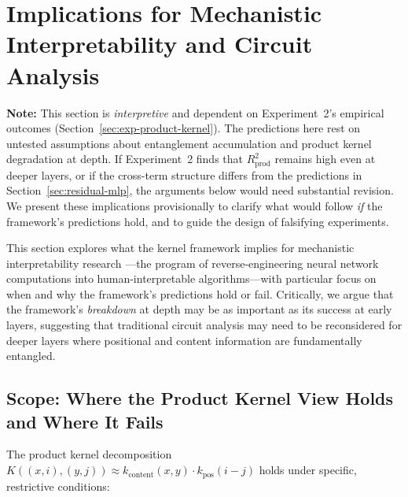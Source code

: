 \documentclass[11pt]{article}
\theoremstyle{definition}
\begin{document}
\section{Implications for Mechanistic Interpretability and Circuit Analysis}
\label{sec:circuits-implications}

\textbf{Note:} This section is \emph{interpretive} and dependent on Experiment~2's empirical outcomes (Section~\ref{sec:exp-product-kernel}). The predictions here rest on untested assumptions about entanglement accumulation and product kernel degradation at depth. If Experiment~2 finds that $R^2_{\text{prod}}$ remains high even at deeper layers, or if the cross-term structure differs from the predictions in Section~\ref{sec:residual-mlp}, the arguments below would need substantial revision. We present these implications provisionally to clarify what would follow \emph{if} the framework's predictions hold, and to guide the design of falsifying experiments.

This section explores what the kernel framework implies for mechanistic interpretability research \cite{elhage2021framework,olah2020zoom}---the program of reverse-engineering neural network computations into human-interpretable algorithms---with particular focus on when and why the framework's predictions hold or fail. Critically, we argue that the framework's \emph{breakdown} at depth may be as important as its success at early layers, suggesting that traditional circuit analysis may need to be reconsidered for deeper layers where positional and content information are fundamentally entangled.

\subsection{Scope: Where the Product Kernel View Holds and Where It Fails}

The product kernel decomposition $K((x,i),(y,j)) \approx k_{\text{content}}(x,y) \cdot k_{\text{pos}}(i-j)$ holds under specific, restrictive conditions:
\end{document}
